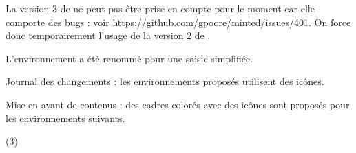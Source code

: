 \documentclass[12pt, a4paper, theme = color]{tutodoc}
\begin{document}
\begin{tdoctech}
    \item La version 3 de  ne peut pas être prise en compte pour le moment car elle comporte des bugs : voir \url{https://github.com/gpoore/minted/issues/401}. On force donc temporairement l'usage de la version 2 de .
\end{tdoctech}


\begin{tdocbreak}
    \item L'environnement  a été renommé  pour une saisie simplifiée.
\end{tdocbreak}


\begin{tdocnew}
    \item Journal des changements : les environnements proposés utilisent des icônes.


    \item Mise en avant de contenus : des cadres colorés avec des icônes sont proposés pour les environnements suivants.
    \begin{tasks}[label=\arabic*.](3)
        \task {}
        \task {}
        \task {}
        \task {}
        \task {}
    \end{tasks}
\end{tdocnew}
\end{document}
